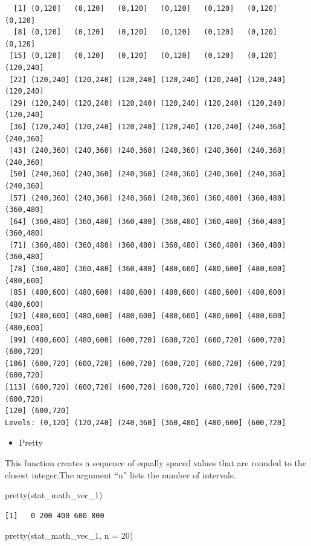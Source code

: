 \documentclass[
  letterpaper,
  DIV=11,
  numbers=noendperiod]{scrreprt}
\newenvironment{Shaded}{\begin{snugshade}}{\end{snugshade}}
\newcommand{\AttributeTok}[1]{\textcolor[rgb]{0.40,0.45,0.13}{#1}}
\newcommand{\DecValTok}[1]{\textcolor[rgb]{0.68,0.00,0.00}{#1}}
\newcommand{\FunctionTok}[1]{\textcolor[rgb]{0.28,0.35,0.67}{#1}}
\newcommand{\NormalTok}[1]{\textcolor[rgb]{0.00,0.23,0.31}{#1}}
\providecommand{\tightlist}{%
  \setlength{\itemsep}{0pt}\setlength{\parskip}{0pt}}\usepackage{longtable,booktabs,array}
\begin{document}
\begin{verbatim}
  [1] (0,120]   (0,120]   (0,120]   (0,120]   (0,120]   (0,120]   (0,120]  
  [8] (0,120]   (0,120]   (0,120]   (0,120]   (0,120]   (0,120]   (0,120]  
 [15] (0,120]   (0,120]   (0,120]   (0,120]   (0,120]   (0,120]   (120,240]
 [22] (120,240] (120,240] (120,240] (120,240] (120,240] (120,240] (120,240]
 [29] (120,240] (120,240] (120,240] (120,240] (120,240] (120,240] (120,240]
 [36] (120,240] (120,240] (120,240] (120,240] (120,240] (240,360] (240,360]
 [43] (240,360] (240,360] (240,360] (240,360] (240,360] (240,360] (240,360]
 [50] (240,360] (240,360] (240,360] (240,360] (240,360] (240,360] (240,360]
 [57] (240,360] (240,360] (240,360] (240,360] (360,480] (360,480] (360,480]
 [64] (360,480] (360,480] (360,480] (360,480] (360,480] (360,480] (360,480]
 [71] (360,480] (360,480] (360,480] (360,480] (360,480] (360,480] (360,480]
 [78] (360,480] (360,480] (360,480] (480,600] (480,600] (480,600] (480,600]
 [85] (480,600] (480,600] (480,600] (480,600] (480,600] (480,600] (480,600]
 [92] (480,600] (480,600] (480,600] (480,600] (480,600] (480,600] (480,600]
 [99] (480,600] (480,600] (600,720] (600,720] (600,720] (600,720] (600,720]
[106] (600,720] (600,720] (600,720] (600,720] (600,720] (600,720] (600,720]
[113] (600,720] (600,720] (600,720] (600,720] (600,720] (600,720] (600,720]
[120] (600,720]
Levels: (0,120] (120,240] (240,360] (360,480] (480,600] (600,720]
\end{verbatim}

\begin{itemize}
\tightlist
\item
  Pretty
\end{itemize}

This function creates a sequence of equally spaced values that are
rounded to the closest integer.The argument ``n'' lists the number of
intervals.

\begin{Shaded}
\begin{Highlighting}[]
\FunctionTok{pretty}\NormalTok{(stat\_math\_vec\_1)}
\end{Highlighting}
\end{Shaded}

\begin{verbatim}
[1]   0 200 400 600 800
\end{verbatim}

\begin{Shaded}
\begin{Highlighting}[]
\FunctionTok{pretty}\NormalTok{(stat\_math\_vec\_1, }\AttributeTok{n =} \DecValTok{20}\NormalTok{)}
\end{Highlighting}
\end{Shaded}
\end{document}
